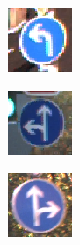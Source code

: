 \begin{figure}
\begin{subfigure}{.19\linewidth}
\includegraphics[width=0.7\linewidth]{imgs/missing/00000_00012}
\end{subfigure}
\begin{subfigure}{.19\linewidth}
\includegraphics[width=0.7\linewidth]{imgs/missing/00001_00016}
\end{subfigure}
\begin{subfigure}{.19\linewidth}
\includegraphics[width=0.7\linewidth]{imgs/missing/00001_00027}

\end{subfigure}
\end{figure}
